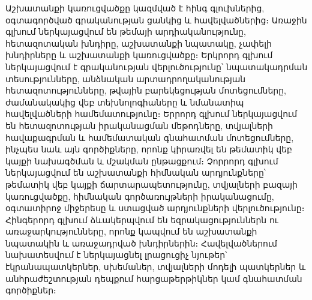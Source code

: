 Աշխատանքի կառուցվածքը կազմված է հինգ գլուխներից, օգտագործված գրականության ցանկից և հավելվածներից։ Առաջին գլխում ներկայացվում են թեմայի արդիականությունը, հետազոտական խնդիրը, աշխատանքի նպատակը, չափելի խնդիրները և աշխատանքի կառուցվածքը։ Երկրորդ գլխում ներկայացվում է գրականության վերլուծությունը՝ նպատակադրման տեսությունները, անձնական արտադրողականության հետազոտությունները, թվային բարեկեցության մոտեցումները, ժամանակակից վեբ տեխնոլոգիաները և նմանատիպ հավելվածների համեմատությունը։ Երրորդ գլխում ներկայացվում են հետազոտության իրականացման մեթոդները, տվյալների հավաքագրման և համեմատական գնահատման մոտեցումները, ինչպես նաև այն գործիքները, որոնք կիրառվել են թեմատիկ վեբ կայքի նախագծման և մշակման ընթացքում։ Չորրորդ գլխում ներկայացվում են աշխատանքի հիմնական արդյունքները՝ թեմատիկ վեբ կայքի ճարտարապետությունը, տվյալների բազայի կառուցվածքը, հիմնական գործառույթների իրականացումը, օգտատիրոջ միջերեսը և ստացված արդյունքների վերլուծությունը։ Հինգերորդ գլխում ձևակերպվում են եզրակացություններն ու առաջարկությունները, որոնք կապվում են աշխատանքի նպատակին և առաջադրված խնդիրներին։ Հավելվածներում նախատեսվում է ներկայացնել լրացուցիչ նյութեր՝ էկրանապատկերներ, սխեմաներ, տվյալների մոդելի պատկերներ և անհրաժեշտության դեպքում հարցաթերթիկներ կամ գնահատման գործիքներ։

\fussy
